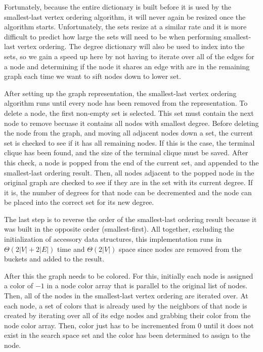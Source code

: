 \documentclass{article}
\begin{document}
        Fortunately, because the entire dictionary is built before it is used by the smallest-last vertex ordering algorithm, it will never again be resized once the algorithm starts. Unfortunately, the sets resize at a similar rate and it is more difficult to predict how large the sets will need to be when performing smallest-last vertex ordering. The degree dictionary will also be used to index into the sets, so we gain a speed up here by not having to iterate over all of the edges for a node and determining if the node it shares an edge with are in the remaining graph each time we want to sift nodes down to lower set.
        \par
        After setting up the graph representation, the smallest-last vertex ordering algorithm runs until every node has been removed from the representation. To delete a node, the first non-empty set is selected. This set must contain the next node to remove becuase it contains all nodes with smallest degree. Before deleting the node from the graph, and moving all adjacent nodes down a set, the current set is checked to see if it has all remaining nodes. If this is the case, the terminal clique has been found, and the size of the terminal clique must be saved. After this check, a node is popped from the end of the current set, and appended to the smallest-last ordering result. Then, all nodes adjacent to the popped node in the original graph are checked to see if they are in the set with its current degree. If it is, the number of degrees for that node can be decremented and the node can be placed into the correct set for its new degree.
        \par
        The last step is to reverse the order of the smallest-last ordering result because it was built in the opposite order (smallest-first). All together, excluding the initialization of accessory data structures, this implementation runs in $\Theta(2|V| + 2|E|)$ time and $\Theta(2|V|)$ space since nodes are removed from the buckets and added to the result.
        \par
        After this the graph needs to be colored. For this, initially each node is assigned a color of $-1$ in a node color array that is parallel to the original list of nodes. Then, all of the nodes in the smallest-last vertex ordering are iterated over. At each node, a set of colors that is already used by the neighbors of that node is created by iterating over all of its edge nodes and grabbing their color from the node color array. Then, color just has to be incremented from $0$ until it does not exist in the search space set and the color has been determined to assign to the node.
\end{document}
